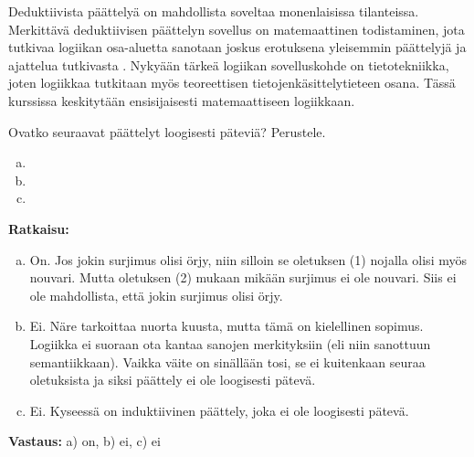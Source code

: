 Deduktiivista päättelyä on mahdollista soveltaa monenlaisissa tilanteissa. Merkittävä deduktiivisen päättelyn sovellus on matemaattinen todistaminen, jota tutkivaa logiikan osa-aluetta sanotaan joskus  erotuksena yleisemmin päättelyjä ja ajattelua tutkivasta . Nykyään tärkeä logiikan sovelluskohde on tietotekniikka, joten logiikkaa tutkitaan myös teoreettisen tietojen\-käsittely\-tieteen osana. Tässä kurssissa keskitytään ensisijaisesti matemaattiseen logiikkaan.

\begin{esimerkki} Ovatko seuraavat päättelyt loogisesti päteviä? Perustele.
    \begin{enumerate}[a)]
        \item {}
        \item {}
        \item {}
    \end{enumerate}
    \textbf{Ratkaisu:}
        \begin{enumerate}[a)]
            \item On. Jos jokin surjimus olisi örjy, niin silloin se oletuksen (1) nojalla olisi myös nouvari.
                Mutta oletuksen (2) mukaan mikään surjimus ei ole nouvari. Siis ei ole mahdollista, että jokin surjimus olisi örjy. 
            \item Ei. Näre tarkoittaa nuorta kuusta, mutta tämä on kielellinen sopimus. Logiikka ei suoraan ota kantaa sanojen merkityksiin (eli niin sanottuun semantiikkaan). Vaikka väite on sinällään tosi, se ei kuitenkaan seuraa oletuksista ja siksi päättely ei ole loogisesti pätevä.
            \item Ei. Kyseessä on induktiivinen päättely, joka ei ole loogisesti pätevä.
        \end{enumerate}
    \textbf{Vastaus:}
        a) on, b) ei, c) ei
\end{esimerkki}

